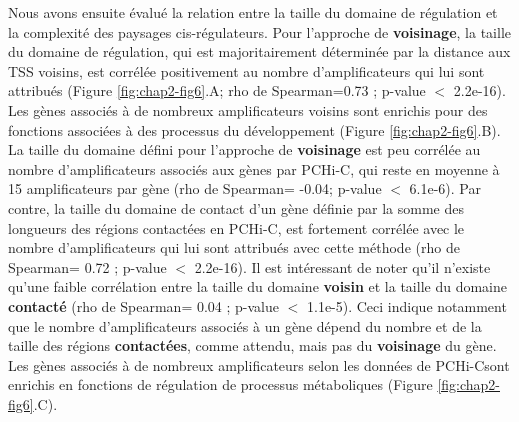 Nous avons ensuite évalué la relation entre la taille du domaine de régulation et la complexité des paysages \gls{cis}-régulateurs. Pour l’approche de \textbf{voisinage}, la taille du domaine de régulation, qui est majoritairement déterminée par la distance aux \acrshort{TSS} voisins, est corrélée positivement au nombre d’\glspl{amplificateur} qui lui sont attribués (Figure \ref{fig:chap2-fig6}.A; rho de Spearman=0.73 ; p-value $<$ 2.2e-16). Les gènes associés à de nombreux \glspl{amplificateur} voisins sont enrichis pour des fonctions associées à des processus du développement (Figure \ref{fig:chap2-fig6}.B). La taille du domaine défini pour l'approche de \textbf{voisinage} est peu corrélée au nombre d’\glspl{amplificateur} associés aux gènes par \gls{PCHi-C}, qui reste en moyenne à 15 \glspl{amplificateur} par gène (rho de Spearman= -0.04; p-value $<$ 6.1e-6). Par contre, la taille du domaine de contact d’un gène définie par la somme des longueurs des régions contactées en \gls{PCHi-C}, est fortement corrélée avec le nombre d’\glspl{amplificateur} qui lui sont attribués avec cette méthode (rho de Spearman= 0.72 ; p-value $<$ 2.2e-16). Il est intéressant de noter qu’il n'existe qu’une faible corrélation entre la taille du domaine \textbf{voisin} et la taille du domaine \textbf{contacté} (rho de Spearman= 0.04 ; p-value $<$ 1.1e-5). Ceci indique notamment que le nombre d’\glspl{amplificateur} associés à un gène dépend du nombre et de la taille des régions \textbf{contactées}, comme attendu, mais pas du \textbf{voisinage} du gène. Les gènes associés à de nombreux \glspl{amplificateur} selon les données de \acrshort{PCHi-C}sont enrichis en fonctions de régulation de processus métaboliques (Figure \ref{fig:chap2-fig6}.C).

